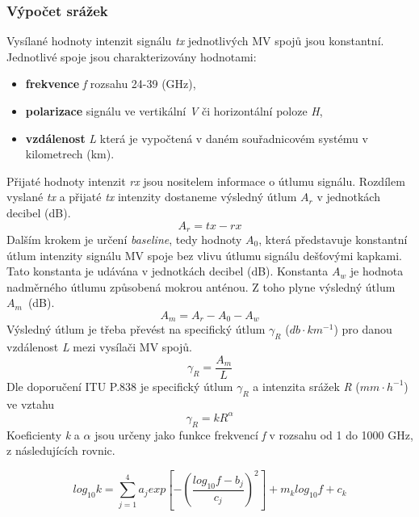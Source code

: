 \documentclass[a4paper,12pt,oneside]{report}
\begin{document}
\subsubsection{Výpočet srážek}
Vysílané hodnoty intenzit signálu \emph{tx} jednotlivých MV spojů jsou
konstantní. Jednotlivé spoje jsou charakterizovány hodnotami:
\begin{itemize}
\item \textbf{frekvence} \emph{f} rozsahu 24-39 (GHz),
\item \textbf{polarizace} signálu ve vertikální \emph{V} či horizontální poloze \emph{H},
\item \textbf{vzdálenost} \emph{L} která je vypočtená v daném souřadnicovém systému v kilometrech (km).
\end{itemize}
Přijaté hodnoty intenzit \emph{rx} jsou nositelem informace o útlumu
signálu. Rozdílem vyslané \emph{tx} a přijaté \emph{tx} intenzity
dostaneme výsledný útlum \emph{$A_{r}$} v jednotkách decibel (dB).
\begin{equation}
 A_{r}=tx-rx
\end{equation}
Dalším krokem je určení \emph{baseline}, tedy hodnoty \emph{ $A_{0}$},
 která představuje konstantní útlum intenzity signálu MV spoje bez
vlivu útlumu signálu dešťovými kapkami. Tato konstanta je udávána v jednotkách
decibel (dB). Konstanta \emph{$A_{w}$} je hodnota
nadměrného útlumu způsobená mokrou anténou. Z toho plyne výsledný
útlum \emph{$A_{m}$}~(dB).
\begin{equation}\label{eq:Ar}
 A_{m}=A_{r}-A_{0}-A_{w}
\end{equation}
Výsledný útlum je třeba převést na specifický útlum \emph{$\gamma_{R}
  $} ($db \cdot km^{-1}$) pro danou vzdálenost \emph{L} mezi vysílači MV spojů.
\begin{equation}
\gamma_{R} =\frac{A_{m}}{L}
\end{equation}
Dle doporučení ITU P.838 \cite{itu} je specifický útlum
\emph{$\gamma_{R} $} a intenzita srážek \emph{R} ($mm \cdot h^{-1}$) ve vztahu
\begin{equation}\label{eq:gamma}
\gamma_{R}=kR^{\alpha}
\end{equation}
Koeficienty \emph{k} a \emph{$\alpha$} jsou určeny jako funkce
frekvencí \emph{f} v rozsahu od 1 do 1000 GHz, z následujících rovnic.

\begin{equation}
log_{10}k=\sum_{j=1}^{4} a_{j} exp\left [ -\left ( \frac{log_{10}f-b_{j}}{c_{j}} \right )^{2} \right ]+m {_{k}}log_{10}f+c_{k}
\end{equation}
\end{document}
